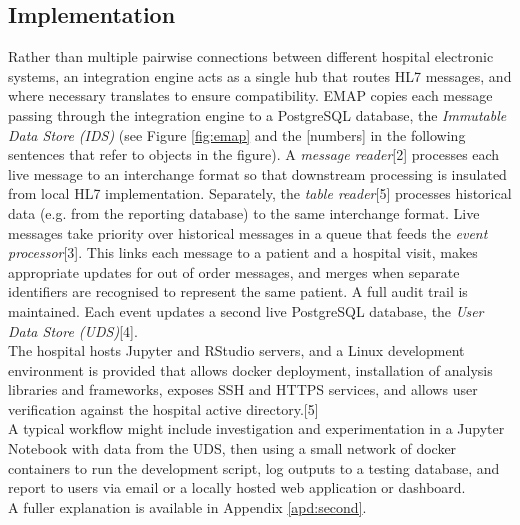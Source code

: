 \documentclass[pmlr,twocolumn,10pt]{jmlr} %
\begin{document}
\subsection{Implementation}
Rather than multiple pairwise connections between different hospital electronic systems, an integration engine acts as a single hub that routes HL7 messages, and where necessary translates to ensure compatibility. EMAP  copies each message passing through the integration engine to a PostgreSQL database, the \textit{Immutable Data Store (IDS)} (see Figure \ref{fig:emap} and the [numbers] in the following sentences that refer to objects in the figure). A \textit{message reader}[2] processes each live message to an interchange format so that downstream processing is insulated from local HL7 implementation. Separately, the \textit{table reader}[5] processes historical data (e.g. from the reporting database) to the same interchange format. Live messages take priority over historical messages in a queue that feeds the \textit{event processor}[3]. This links each message to a patient and a hospital visit, makes appropriate updates for out of order messages, and merges when separate identifiers are recognised to represent the same patient. A full audit trail is maintained. Each event updates a second live PostgreSQL database, the \textit{User Data Store (UDS)}[4].\\
The hospital hosts Jupyter and RStudio servers, and a Linux development environment is provided that allows docker deployment, installation of analysis libraries and frameworks, exposes SSH and HTTPS services, and allows user verification against the hospital active directory.[5] \\
A typical workflow might include investigation and experimentation in a Jupyter Notebook with data from the UDS, then using a small network of docker containers to run the development script, log outputs to a testing database, and report to users via email or a locally hosted web application or dashboard. \\
A fuller explanation is available in Appendix \ref{apd:second}.
\end{document}
